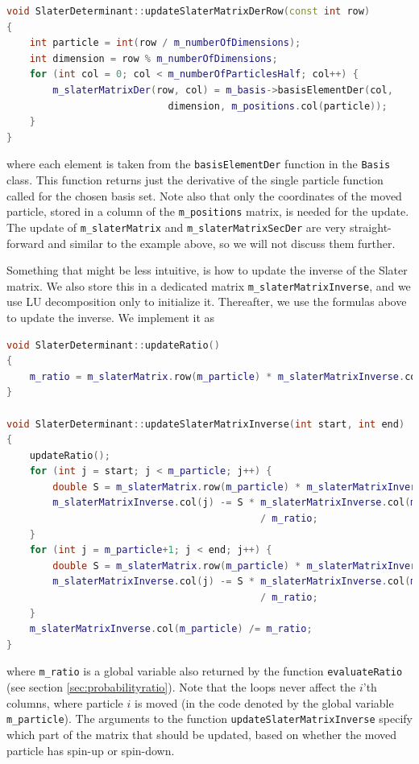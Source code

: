 \begin{lstlisting}[language={c++},caption={Taken from \lstinline{slaterdeterminant.cpp}.}]
void SlaterDeterminant::updateSlaterMatrixDerRow(const int row)
{
	int particle = int(row / m_numberOfDimensions);
	int dimension = row % m_numberOfDimensions;
	for (int col = 0; col < m_numberOfParticlesHalf; col++) {
		m_slaterMatrixDer(row, col) = m_basis->basisElementDer(col,
							dimension, m_positions.col(particle));
	}
}
\end{lstlisting}
where each element is taken from the \lstinline{basisElementDer} function in the \lstinline{Basis} class. This function returns just the derivative of the single particle function called for the chosen basis set. Note also that only the coordinates of the moved particle, stored in a column of the \lstinline{m_positions} matrix, is needed for the update. The update of \lstinline{m_slaterMatrix} and \lstinline{m_slaterMatrixSecDer} are very straight-forward and similar to the example above, so we will not discuss them further.

Something that might be less intuitive, is how to update the inverse of the Slater matrix. We also store this in a dedicated matrix \lstinline{m_slaterMatrixInverse}, and we use LU decomposition only to initialize it. Thereafter, we use the formulas above to update the inverse. We implement it as

\begin{lstlisting}[language={c++},caption={Taken from \lstinline{slaterdeterminant.cpp}.}]
void SlaterDeterminant::updateRatio()
{
	m_ratio = m_slaterMatrix.row(m_particle) * m_slaterMatrixInverse.col(m_particle);
}

void SlaterDeterminant::updateSlaterMatrixInverse(int start, int end)
{
	updateRatio();
	for (int j = start; j < m_particle; j++) {
		double S = m_slaterMatrix.row(m_particle) * m_slaterMatrixInverse.col(j);
		m_slaterMatrixInverse.col(j) -= S * m_slaterMatrixInverse.col(m_particle) 
											/ m_ratio;
	}
	for (int j = m_particle+1; j < end; j++) {
		double S = m_slaterMatrix.row(m_particle) * m_slaterMatrixInverse.col(j);
		m_slaterMatrixInverse.col(j) -= S * m_slaterMatrixInverse.col(m_particle) 
											/ m_ratio;
	}
	m_slaterMatrixInverse.col(m_particle) /= m_ratio;
}
\end{lstlisting}
where \lstinline{m_ratio} is a global variable also returned by the function \lstinline{evaluateRatio} (see section \ref{sec:probabilityratio}). Note that the loops never affect the $i$'th columns, where particle $i$ is moved (in the code denoted by the global variable \lstinline{m_particle}). The arguments to the function \lstinline{updateSlaterMatrixInverse} specify which part of the matrix that should be updated, based on whether the moved particle has spin-up or spin-down.

